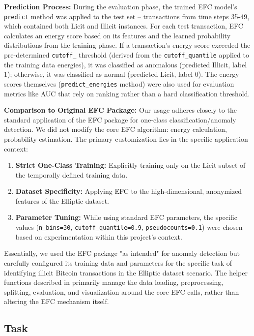\documentclass[12pt]{article}
\begin{document}
\textbf{Prediction Process:} During the evaluation phase, the trained EFC model's \texttt{predict} method was applied to
the test set -- transactions from time steps 35-49, which contained both Licit and Illicit instances. For each test
transaction, EFC calculates an energy score based on its features and the learned probability distributions from the
training phase. If a transaction's energy score exceeded the pre-determined \texttt{cutoff\_} threshold (derived from
the \texttt{cutoff\_quantile} applied to the training data energies), it was classified as anomalous (predicted Illicit,
label 1); otherwise, it was classified as normal (predicted Licit, label 0). The energy scores themselves
(\texttt{predict\_energies} method) were also used for evaluation metrics like AUC that rely on ranking rather than a
hard classification threshold.

\textbf{Comparison to Original EFC Package:} Our usage adheres closely to the standard application of the EFC package for
one-class classification/anomaly detection. We did not modify the core EFC algorithm: energy calculation, probability
estimation. The primary customization lies in the specific application context:

\begin{enumerate}
    \item \textbf{Strict One-Class Training:} Explicitly training only on the Licit subset of the temporally defined training data.
    \item \textbf{Dataset Specificity:} Applying EFC to the high-dimensional, anonymized features of the Elliptic dataset.
    \item \textbf{Parameter Tuning:} While using standard EFC parameters, the specific values (\texttt{n\_bins=30},
    \texttt{cutoff\_quantile=0.9}, \texttt{pseudocounts=0.1}) were chosen based on experimentation within this project's
    context.
\end{enumerate}

Essentially, we used the EFC package "as intended" for anomaly detection but carefully configured its training data and
parameters for the specific task of identifying illicit Bitcoin transactions in the Elliptic dataset scenario. The helper
functions described in \cite{reproducibility} primarily manage the data loading, preprocessing, splitting, evaluation,
and visualization around the core EFC calls, rather than altering the EFC mechanism itself.


\subsection{Task} \label{subsec:task}
\end{document}
